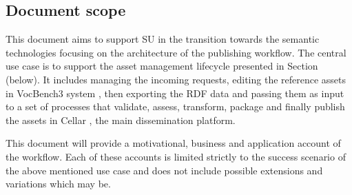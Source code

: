 	\subsection{Document scope}
	\label{sec:scope}
	
	This document aims to support SU in the transition towards the semantic technologies focusing on the architecture of the publishing workflow. 
	The central use case is to support the asset management lifecycle presented in Section (below). It includes managing the incoming requests, editing the reference assets in VocBench3 system \citep{stellato2017towards,stellatovocbench}, then exporting the RDF data and passing them as input to a set of processes that validate, assess, transform, package and finally publish the assets in Cellar \cite{cdm-francesconi2015ontology}, the main dissemination platform.
	
	This document will provide a motivational, business and application account of the workflow. Each of these accounts is limited strictly to the success scenario of the above mentioned use case and does not include possible extensions and variations which may be. 
	
